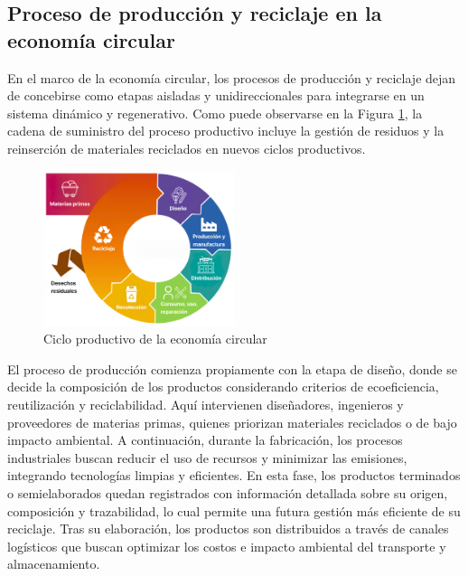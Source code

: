 \subsection{Proceso de producción y reciclaje en la economía circular}

En el marco de la economía circular, los procesos de producción y reciclaje dejan de concebirse como etapas aisladas y unidireccionales para integrarse en un sistema dinámico y regenerativo. Como puede observarse en la Figura \ref{fig:circular-economy-stages}, la cadena de suministro del proceso productivo incluye la gestión de residuos y la reinserción de materiales reciclados en nuevos ciclos productivos.

\begin{figure}[!tb]
    \centering
    \includegraphics[width=0.5\textwidth]{Figures/circular-economy-stages.png}
    \caption{Ciclo productivo de la economía circular}
    \label{fig:circular-economy-stages}
\end{figure}

El proceso de producción comienza propiamente con la etapa de diseño, donde se decide la composición de los productos considerando criterios de ecoeficiencia, reutilización y reciclabilidad. Aquí intervienen diseñadores, ingenieros y proveedores de materias primas, quienes priorizan materiales reciclados o de bajo impacto ambiental. A continuación, durante la fabricación, los procesos industriales buscan reducir el uso de recursos y minimizar las emisiones, integrando tecnologías limpias y eficientes. En esta fase, los productos terminados o semielaborados quedan registrados con información detallada sobre su origen, composición y trazabilidad, lo cual permite una futura gestión más eficiente de su reciclaje. Tras su elaboración, los productos son distribuidos a través de canales logísticos que buscan optimizar los costos e impacto ambiental del transporte y almacenamiento.

